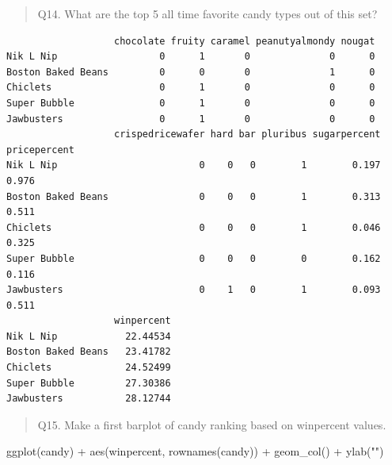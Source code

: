 \documentclass[
  letterpaper,
  DIV=11,
  numbers=noendperiod]{scrartcl}
\newenvironment{Shaded}{\begin{snugshade}}{\end{snugshade}}
\newcommand{\AttributeTok}[1]{\textcolor[rgb]{0.40,0.45,0.13}{#1}}
\newcommand{\DecValTok}[1]{\textcolor[rgb]{0.68,0.00,0.00}{#1}}
\newcommand{\FunctionTok}[1]{\textcolor[rgb]{0.28,0.35,0.67}{#1}}
\newcommand{\NormalTok}[1]{\textcolor[rgb]{0.00,0.23,0.31}{#1}}
\newcommand{\SpecialCharTok}[1]{\textcolor[rgb]{0.37,0.37,0.37}{#1}}
\newcommand{\StringTok}[1]{\textcolor[rgb]{0.13,0.47,0.30}{#1}}
\begin{document}
\begin{quote}
Q14. What are the top 5 all time favorite candy types out of this set?
\end{quote}

\begin{Shaded}
\end{Shaded}

\begin{verbatim}
                   chocolate fruity caramel peanutyalmondy nougat
Nik L Nip                  0      1       0              0      0
Boston Baked Beans         0      0       0              1      0
Chiclets                   0      1       0              0      0
Super Bubble               0      1       0              0      0
Jawbusters                 0      1       0              0      0
                   crispedricewafer hard bar pluribus sugarpercent pricepercent
Nik L Nip                         0    0   0        1        0.197        0.976
Boston Baked Beans                0    0   0        1        0.313        0.511
Chiclets                          0    0   0        1        0.046        0.325
Super Bubble                      0    0   0        0        0.162        0.116
Jawbusters                        0    1   0        1        0.093        0.511
                   winpercent
Nik L Nip            22.44534
Boston Baked Beans   23.41782
Chiclets             24.52499
Super Bubble         27.30386
Jawbusters           28.12744
\end{verbatim}

\begin{quote}
Q15. Make a first barplot of candy ranking based on winpercent values.
\end{quote}

\begin{Shaded}
\begin{Highlighting}[]
\FunctionTok{ggplot}\NormalTok{(candy) }\SpecialCharTok{+} 
  \FunctionTok{aes}\NormalTok{(winpercent, }\FunctionTok{rownames}\NormalTok{(candy)) }\SpecialCharTok{+}
  \FunctionTok{geom\_col}\NormalTok{() }\SpecialCharTok{+}
\FunctionTok{ylab}\NormalTok{(}\StringTok{""}\NormalTok{)}
\end{Highlighting}
\end{Shaded}
\end{document}
